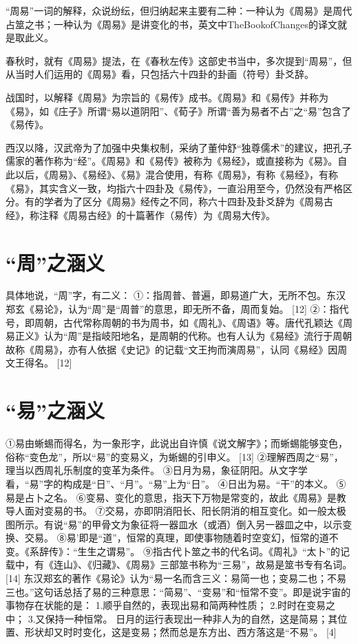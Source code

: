 \documentclass[a4paper,12pt,UTF8,twoside]{ctexbook}
\begin{document}
“周易”一词的解释，众说纷纭，但归纳起来主要有二种：一种认为《周易》是周代占筮之书；一种认为《周易》是讲变化的书，英文中TheBookofChanges的译文就是取此义。

春秋时，就有《周易》提法，在《春秋左传》这部史书当中，多次提到“周易”，但从当时人们运用的《周易》看，只包括六十四卦的卦画（符号）卦爻辞。

战国时，以解释《周易》为宗旨的《易传》成书。《周易》和《易传》并称为《易》，如《庄子》所谓“易以道阴阳”、《荀子》所谓“善为易者不占”之“易”包含了《易传》。

西汉以降，汉武帝为了加强中央集权制，采纳了董仲舒“独尊儒术”的建议，把孔子儒家的著作称为“经”。《周易》和《易传》被称为《易经》，或直接称为《易》。自此以后，《周易》、《易经》、《易》混合使用，有称《周易》，有称《易经》，有称《易》，其实含义一致，均指六十四卦及《易传》，一直沿用至今，仍然没有严格区分。有的学者为了区分《周易》经传之不同，称六十四卦及卦爻辞为《周易古经》，称注释《周易古经》的十篇著作（易传）为《周易大传》。

\section{“周”之涵义}

具体地说，“周”字，有二义：
①：指周普、普遍，即易道广大，无所不包。东汉郑玄《易论》，认为“周”是“周普”的意思，即无所不备，周而复始。 [12]
②：指代号，即周朝，古代常称周朝的书为周书，如《周礼》、《周语》等。唐代孔颖达《周易正义》认为“周”是指岐阳地名，是周朝的代称。也有人认为《易经》流行于周朝故称《周易》，亦有人依据《史记》的记载“文王拘而演周易”，认同《易经》因周文王得名。 [12]

\section{“易”之涵义}

①易由蜥蜴而得名，为一象形字，此说出自许慎《说文解字》；而蜥蜴能够变色，俗称“变色龙”，所以“易”的变易义，为蜥蜴的引申义。 [13]
②理解西周之“易”，理当以西周礼乐制度的变革为条件。
③日月为易，象征阴阳。从文字学看，“易”字的构成是“日”、“月”。“易”上为“日”。
④日出为易。“干”的本义。
⑤易是占卜之名。
⑥变易、变化的意思，指天下万物是常变的，故此《周易》是教导人面对变易的书。
⑦交易，亦即阴消阳长、阳长阴消的相互变化。如一般太极图所示。有说“易”的甲骨文为象征将一器皿水（或酒）倒入另一器皿之中，以示变换、交易。
⑧易’即是“道”，恒常的真理，即使事物随着时空变幻，恒常的道不变。《系辞传》：“生生之谓易”。
⑨指古代卜筮之书的代名词。《周礼》“太卜”的记载中，有《连山》、《归藏》、《周易》三部筮书称为“三易”，故易是筮书专有名词。 [14]
东汉郑玄的著作《易论》认为“易一名而含三义：易简一也；变易二也；不易三也。”这句话总括了易的三种意思：“简易”、“变易”和“恒常不变”。即是说宇宙的事物存在状能的是：
1.顺乎自然的，表现出易和简两种性质；
2.时时在变易之中；
3.又保持一种恒常。
日月的运行表现出一种非人为的自然，这是简易；其位置、形状却又时时变化，这是变易；然而总是东方出、西方落这是“不易”。 [4]
\end{document}

